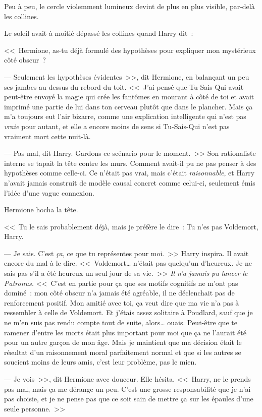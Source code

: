 Peu à peu, le cercle violemment lumineux devint de plus en plus visible, par-delà les collines.

Le soleil avait à moitié dépassé les collines quand Harry dit~:

<<~Hermione, as-tu déjà formulé des hypothèses pour expliquer mon mystérieux côté obscur~?

--- Seulement les hypothèses évidentes~>>, dit Hermione, en balançant un peu ses jambes au-dessus du rebord du toit. <<~J'ai pensé que Tu-Sais-Qui avait peut-être envoyé la magie qui crée les fantômes en mourant à côté de toi et avait imprimé une partie de lui dans ton cerveau plutôt que dans le plancher. Mais ça m'a toujours eut l'air bizarre, comme une explication intelligente qui n'est pas \emph{vraie} pour autant, et elle a encore moins de sens si Tu-Sais-Qui n'est pas vraiment mort cette nuit-là.

--- Pas mal, dit Harry. Gardons ce scénario pour le moment.~>> Son rationaliste interne se tapait la tête contre les murs. Comment avait-il pu ne pas penser à des hypothèses comme celle-ci. Ce n'était pas vrai, mais c'était \emph{raisonnable}, et Harry n'avait jamais construit de modèle causal concret comme celui-ci, seulement émis l'idée d'une vague connexion.

Hermione hocha la tête.

<<~Tu le sais probablement déjà, mais je préfère le dire~: Tu n'es pas Voldemort, Harry.

--- Je sais. C'est \emph{ça}, ce que tu représentes pour moi.~>> Harry inspira. Il avait encore du mal à le dire. <<~Voldemort… n'était pas quelqu'un d'heureux. Je ne sais pas s'il a été heureux un seul jour de sa vie.~>> \emph{Il n'a jamais pu lancer le Patronus.} <<~C'est en partie pour ça que ses motifs cognitifs ne m'ont pas dominé~: mon côté obscur n'a jamais été agréable, il ne déclenchait pas de renforcement positif. Mon amitié avec toi, ça veut dire que ma vie n'a pas à ressembler à celle de Voldemort. Et j'étais assez solitaire à Poudlard, sauf que je ne m'en suis pas rendu compte tout de suite, alors… ouais. Peut-être que te ramener d'entre les morts était plus important pour moi que ça ne l'aurait été pour un autre garçon de mon âge. Mais je maintient que ma décision était le résultat d'un raisonnement moral parfaitement normal et que si les autres se soucient moins de leurs amis, c'est leur problème, pas le mien.

--- Je vois~>>, dit Hermione avec douceur. Elle hésita. <<~Harry, ne le prends pas mal, mais ça me dérange un peu. C'est une grosse responsabilité que je n'ai pas choisie, et je ne pense pas que ce soit sain de mettre ça sur les épaules d'une seule personne.~>>

